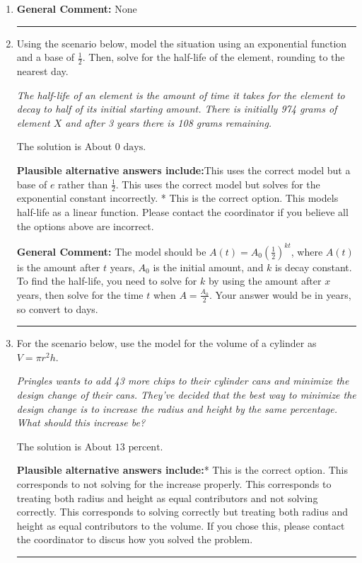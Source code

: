 \documentclass{extbook}[14pt]
\newcommand{\litem}[1]{\item #1

\rule{\textwidth}{0.4pt}}
\begin{document}
\begin{enumerate}\litem{


\textbf{General Comment:} None
}
\litem{
Using the scenario below, model the situation using an exponential function and a base of $\frac{1}{2}$. Then, solve for the half-life of the element, rounding to the nearest day.

\begin{center}
    \textit{ The half-life of an element is the amount of time it takes for the element to decay to half of its initial starting amount. There is initially 974 grams of element $X$ and after 3 years there is 108 grams remaining. }
\end{center}
The solution is \( \text{About } 0 \text{ days} \).\begin{enumerate}[label=\Alph*.]
\textbf{Plausible alternative answers include:}This uses the correct model but a base of $e$ rather than $\frac{1}{2}$.
This uses the correct model but solves for the exponential constant incorrectly.
* This is the correct option.
This models half-life as a linear function.
Please contact the coordinator if you believe all the options above are incorrect.
\end{enumerate}

\textbf{General Comment:} The model should be $A(t) = A_0 (\frac{1}{2})^{kt}$, where $A(t)$ is the amount after $t$ years, $A_0$ is the initial amount, and $k$ is decay constant. To find the half-life, you need to solve for $k$ by using the amount after $x$ years, then solve for the time $t$ when $A = \frac{A_0}{2}$. Your answer would be in years, so convert to days.
}
\litem{
For the scenario below, use the model for the volume of a cylinder as $V = \pi r^2 h$.

\begin{center}
    \textit{ Pringles wants to add 43 \text{percent} more chips to their cylinder cans and minimize the design change of their cans. They've decided that the best way to minimize the design change is to increase the radius and height by the same percentage. What should this increase be? }
\end{center}
The solution is \( \text{About } 13 \text{ percent} \).\begin{enumerate}[label=\Alph*.]
\textbf{Plausible alternative answers include:}* This is the correct option.
This corresponds to not solving for the increase properly.
This corresponds to treating both radius and height as equal contributors and not solving correctly.
This corresponds to solving correctly but treating both radius and height as equal contributors to the volume.
If you chose this, please contact the coordinator to discus how you solved the problem.
\end{enumerate}

}
\end{enumerate}
\end{document}
